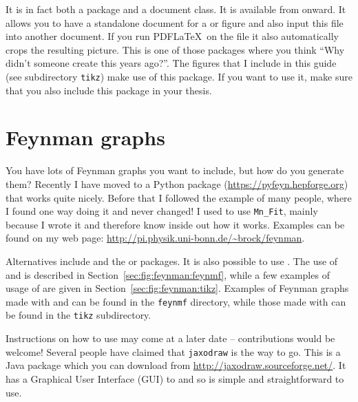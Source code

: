 It is in fact both a package and a document class. It is
available from  onward. It allows you to have a
standalone document for a  or  figure
and also input this file into another document. If you run PDF\LaTeX\
on the file it also automatically crops the resulting picture. This is
one of those packages where you think \enquote{Why didn't someone
  create this years ago?}. The \TikZ figures that I include in this
guide (see subdirectory \texttt{tikz}) make use of this package. If
you want to use it, make sure that you also include this package in
your thesis.


\section{Feynman graphs}
\label{sec:fig:feynman}

You have lots of Feynman graphs you want to include, but how do you
generate them? 
Recently I have moved to a Python package  (\url{https://pyfeyn.hepforge.org})
that works quite nicely.
Before that I followed the example of many people,
where I found one way doing it and never changed!
I used to use \texttt{Mn\_Fit},
mainly because I wrote it and therefore know inside out how it works.
Examples can be found on my web page:
\url{http://pi.physik.uni-bonn.de/~brock/feynman}.

Alternatives include  and the  or
\Package{feynmp} packages.
It is also possible to use .
The use of  and  is
described in Section~\ref{sec:fig:feynman:feynmf}, while a few
examples of usage of  are given in
Section~\ref{sec:fig:feynman:tikz}. Examples of Feynman graphs made
with \Package{feynmf} and \Package{feynmp} can be found in the
\texttt{feynmf} directory, while those made with  can
be found in the \texttt{tikz} subdirectory.

Instructions on how to use  may come at a later
date -- contributions would be welcome! Several people have claimed
that \texttt{jaxodraw} is the way to go. This is a Java package which
you can download from \url{http://jaxodraw.sourceforge.net/}. It has
a Graphical User Interface (GUI) to \Package{axodraw} and so is simple and
straightforward to use.

